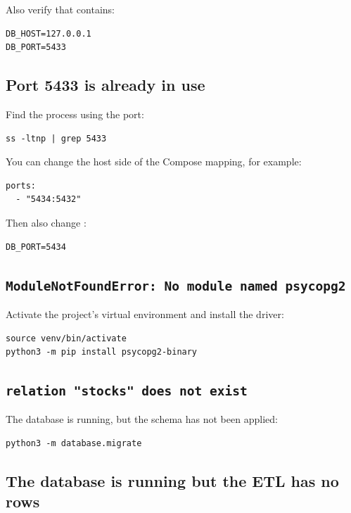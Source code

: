 \documentclass[11pt,a4paper]{article}
\newcommand{\filename}[1]{\texttt{\detokenize{#1}}}
\begin{document}
Also verify that \filename{.env} contains:

\begin{lstlisting}[style=terminal]
DB_HOST=127.0.0.1
DB_PORT=5433
\end{lstlisting}

\subsection{Port 5433 is already in use}

Find the process using the port:

\begin{lstlisting}[style=terminal]
ss -ltnp | grep 5433
\end{lstlisting}

You can change the host side of the Compose mapping, for example:

\begin{lstlisting}[style=terminal]
ports:
  - "5434:5432"
\end{lstlisting}

Then also change \filename{.env}:

\begin{lstlisting}[style=terminal]
DB_PORT=5434
\end{lstlisting}

\subsection{\texttt{ModuleNotFoundError: No module named psycopg2}}

Activate the project's virtual environment and install the driver:

\begin{lstlisting}[style=terminal]
source venv/bin/activate
python3 -m pip install psycopg2-binary
\end{lstlisting}

\subsection{\texttt{relation "stocks" does not exist}}

The database is running, but the schema has not been applied:

\begin{lstlisting}[style=terminal]
python3 -m database.migrate
\end{lstlisting}

\subsection{The database is running but the ETL has no rows}
\end{document}
